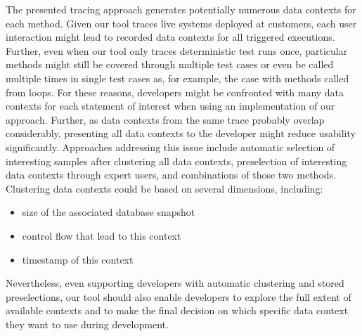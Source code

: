 The presented tracing approach generates potentially numerous data contexts for each method.
Given our tool traces live systems deployed at customers, each user interaction might lead to recorded data contexts for all triggered executions.
Further, even when our tool only traces deterministic test runs once, particular methods might still be covered through multiple test cases or even be called multiple times in single test cases as, for example, the case with methods called from loops.
For these reasons, developers might be confronted with many data contexts for each statement of interest when using an implementation of our approach.
Further, as data contexts from the same trace probably overlap considerably, presenting all data contexts to the developer might reduce usability significantly.
Approaches addressing this issue include automatic selection of interesting samples after clustering all data contexts, preselection of interesting data contexts through expert users, and combinations of those two methods.
Clustering data contexts could be based on several dimensions, including:
\begin{itemize}
  \item size of the associated database snapshot
  \item control flow that lead to this context
  \item timestamp of this context
\end{itemize}
Nevertheless, even supporting developers with automatic clustering and stored preselections, our tool should also enable developers to explore the full extent of available contexts and to make the final decision on which specific data context they want to use during development.
